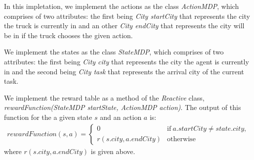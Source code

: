 \documentclass[11pt]{article}
\begin{document}
In this impletation, we implement the actions as the class \emph{ActionMDP}, which comprises of two attributes: the first being \emph{City startCity} that represents the city the truck is currently in and an other \emph{City endCity} that represents the city will be in if the truck chooses the given action.

We implement the states as the class \emph{StateMDP}, which comprises of two attributes: the first being \emph{City city} that represents the city the agent is currently in and the second being \emph{City task} that represents the arrival city of the current task.

We implement the reward table as a method of the \emph{Reactive} class, \emph{rewardFunction(StateMDP startState, ActionMDP action)}. The output of this function for the a given state $s$ and an action $a$ is: 
 	\begin{align*}
 		rewardFunction(s,a)= 
 			\begin{cases}
 				0 & \mathrm{if}\ a.startCity\neq state.city,\\
 				r(s.city,a.endCity) & \mathrm{otherwise}
			\end{cases}
	\end{align*}
where $r(s.city,a.endCity)$  is given above.
 
\end{document}
